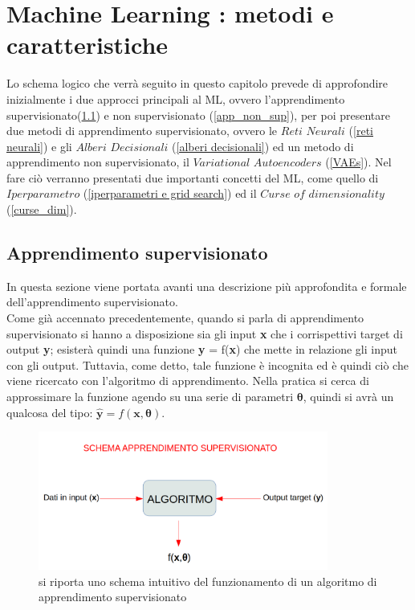 \section{Machine Learning : metodi e caratteristiche}
\label{ML: metodi e caratteristiche}

Lo schema logico che verrà seguito in questo capitolo prevede di approfondire inizialmente i due approcci principali al ML, ovvero l'apprendimento supervisionato(\ref{app_sup}) e non supervisionato (\ref{app_non_sup}), per poi presentare due metodi di apprendimento supervisionato, ovvero le $\textit{Reti Neurali}$ (\ref{reti neurali}) e gli $\textit{Alberi Decisionali}$ (\ref{alberi decisionali}) ed un metodo di apprendimento non supervisionato, il $\textit{Variational Autoencoders}$ (\ref{VAEs}). Nel fare ciò verranno presentati due importanti concetti del ML, come quello di $\textit{Iperparametro}$ (\ref{iperparametri e grid search}) ed il $\textit{Curse of dimensionality}$ (\ref{curse_dim}).

\subsection{Apprendimento supervisionato}
\label{app_sup}
In questa sezione viene portata avanti una descrizione più approfondita e formale dell'apprendimento supervisionato.\\
Come già accennato precedentemente, quando si parla di apprendimento supervisionato si hanno a disposizione sia gli input \textbf{x} che i corrispettivi target di output \textbf{y}; esisterà quindi una funzione 
\textbf{y} = f(\textbf{x}) che mette in relazione gli input con gli output. Tuttavia, come detto, tale funzione è incognita ed è quindi ciò che viene ricercato con l'algoritmo di apprendimento.
Nella pratica si cerca di approssimare la funzione agendo su una serie di parametri $\bm{\theta}$, quindi si avrà un qualcosa del tipo: $\hat{\textbf{y}} = f(\textbf{x},\bm{\theta})$. \\

\begin{figure}[h!]
	\centering
	\includegraphics[width=0.85\textwidth]{figs/App_sup.png}
	\caption{si riporta uno schema intuitivo del funzionamento di un algoritmo di apprendimento supervisionato}
	\label{fig:schema_app_sup}
\end{figure}



